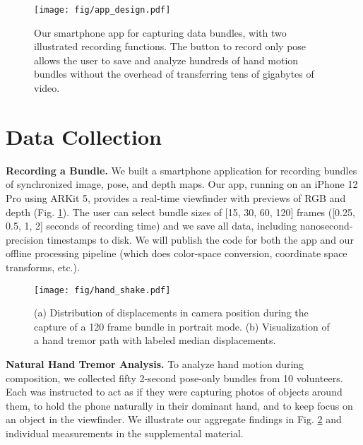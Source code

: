 \begin{figure}[t!]
    \centering
    \texttt{[image: fig/app\_design.pdf]}
    \caption{Our smartphone app for capturing data bundles, with two illustrated recording functions. The button to record only pose allows the user to save and analyze hundreds of hand motion bundles without the overhead of transferring tens of gigabytes of video.}
    \label{fig:data-collection}
    \vspace{-1em}
\end{figure}


\section{Data Collection}
\vspace{0.5em}\noindent\textbf{Recording a Bundle.}\hspace{0.1em} We built a smartphone application for recording bundles of synchronized image, pose, and depth maps. Our app, running on an iPhone 12 Pro using ARKit 5, provides a real-time viewfinder with previews of RGB and depth (Fig. \ref{fig:data-collection}). The user can select bundle sizes of [15, 30, 60, 120] frames ([0.25, 0.5, 1, 2] seconds of recording time) and we save all data, including nanosecond-precision timestamps to disk. We will publish the code for both the app and our offline processing pipeline (which does color-space conversion, coordinate space transforms, etc.).
\begin{figure}[h]
    \centering
    \texttt{[image: fig/hand\_shake.pdf]}
    \caption{(a) Distribution of displacements in camera position during the capture of a 120 frame bundle in portrait mode. (b) Visualization of a hand tremor path with labeled median displacements.}
    \label{fig:hand-shake}
    \vspace{-1em}
\end{figure}

\vspace{0.5em}\noindent\textbf{Natural Hand Tremor Analysis.}\hspace{0.1em} To analyze hand motion during composition, we collected fifty 2-second pose-only bundles from 10 volunteers. Each was instructed to act as if they were capturing photos of objects around them, to hold the phone naturally in their dominant hand, and to keep focus on an object in the viewfinder. We illustrate our aggregate findings in Fig. \ref{fig:hand-shake} and individual measurements in the supplemental material.


